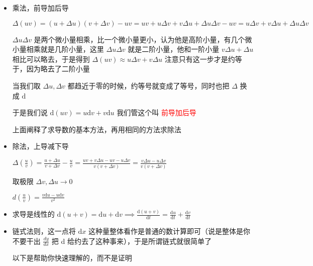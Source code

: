 \documentclass[lang=cn,newtx,10pt,scheme=chinese]{elegantbook}
\begin{document}
\begin{itemize}

  \item 乘法，前导加后导
  
  $\Delta(uv)=(u+\Delta u)(v+\Delta v)-uv=uv+u \Delta v+v \Delta u+ \Delta u \Delta v - uv =u \Delta v+v \Delta u+ \Delta u \Delta v$
  
  $\Delta u \Delta v$ 是两个微小量相乘，比一个微小量更小，认为他是高阶小量，有几个微小量相乘就是几阶小量，这里 $\Delta u \Delta v$ 就是二阶小量，他和一阶小量 $v \Delta u+ \Delta u$ 相比可以略去，于是得到 $\Delta(uv)\approx u \Delta v+v \Delta u $ 注意只有这一步才是约等于，因为略去了二阶小量

  当我们取 $\Delta u ,\Delta v $ 都趋近于零的时候，约等号就变成了等号，同时也把 $\Delta$ 换成 $\mathrm{d}$

  于是我们说 $\mathrm{d} (uv)=u \mathrm{d} v+v\mathrm{d}u$ 我们管这个叫 \textcolor{red}{前导加后导}

  上面阐释了求导数的基本方法，再用相同的方法求除法

  \item 除法，上导减下导
  
  $\Delta \left( \frac{u}{v} \right) = \frac{u+\Delta u}{v+\Delta v}-\frac{u}{v}=\frac{uv+v \Delta u-uv-u \Delta v}{v(v+\Delta v)}=\frac{v \Delta u - u \Delta v}{v(v+\Delta v)}$

  取极限 ${\Delta v,\Delta u \to 0}$

  $d(\frac{u}{v})=\frac{v\mathrm{d}u-u\mathrm{d}v}{v^{2}}$
  
          \item 求导是线性的 $\mathrm{d}(u+v)=\mathrm{d}u+\mathrm{d}v\implies \frac{\mathrm{d}(u+v)}{\mathrm{d}t}=\frac{\mathrm{d}u}{\mathrm{d}t}+\frac{\mathrm{d}v}{\mathrm{d}t}$
          \item 链式法则，这一点将 $\mathrm{d}x$ 这种量整体看作是普通的数计算即可（说是整体是你不要干出 $\frac{dy}{dx}$ 把 d 给约去了这种事来），于是所谓链式就很简单了
          
          以下是帮助你快速理解的，而不是证明


\end{itemize}
\end{document}
